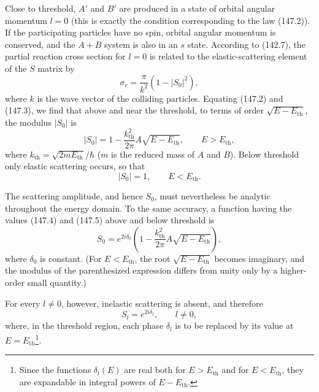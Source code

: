 Close to threshold, $A'$ and $B'$ are produced in a state of orbital angular momentum $l=0$ (this is exactly the condition corresponding to the law (147.2)). If the participating particles have no spin, orbital angular momentum is conserved, and the $A+B$ system is also in an $s$ state. According to (142.7), the partial reaction cross section for $l=0$ is related to the elastic-scattering element of the $S$ matrix by
\begin{equation}
 \sigma_r=\frac\pi{k^2}(1-|S_0|^2),
 \tag{147.3}
\end{equation}
where $k$ is the wave vector of the colliding particles. Equating (147.2) and (147.3), we find that above and near the threshold, to terms of order $\sqrt{E-E_{\mathrm{th}}}$, the modulus $|S_0|$ is
\begin{equation}
 |S_0|=1-\frac{k_{\mathrm{th}}^2}{2\pi}A\sqrt{E-E_{\mathrm{th}}},\qquad E>E_{\mathrm{th}},
 \tag{147.4}
\end{equation}
where $k_{\mathrm{th}}=\sqrt{2mE_{\mathrm{th}}}/\hbar$ ($m$ is the reduced mass of $A$ and $B$). Below threshold only elastic scattering occurs, so that
\begin{equation}
 |S_0|=1,\qquad E<E_{\mathrm{th}}.
 \tag{147.5}
\end{equation}

The scattering amplitude, and hence $S_0$, must nevertheless be analytic throughout the energy domain. To the same accuracy, a function having the values (147.4) and (147.5) above and below threshold is
\begin{equation}
 S_0=e^{2i\delta_0}\left(1-\frac{k_{\mathrm{th}}^2}{2\pi}A\sqrt{E-E_{\mathrm{th}}}\right),
 \tag{147.6}
\end{equation}
where $\delta_0$ is constant. (For $E<E_{\mathrm{th}}$, the root $\sqrt{E-E_{\mathrm{th}}}$ becomes imaginary, and the modulus of the parenthesized expression differs from unity only by a higher-order small quantity.)

For every $l\ne0$, however, inelastic scattering is absent, and therefore
\begin{equation}
 S_l=e^{2i\delta_l},\qquad l\ne0,
 \tag{147.7}
\end{equation}
where, in the threshold region, each phase $\delta_l$ is to be replaced by its value at $E=E_{\mathrm{th}}$\footnote{Since the functions $\delta_l(E)$ are real both for $E>E_{\mathrm{th}}$ and for $E<E_{\mathrm{th}}$, they are expandable in integral powers of $E-E_{\mathrm{th}}$.}.

